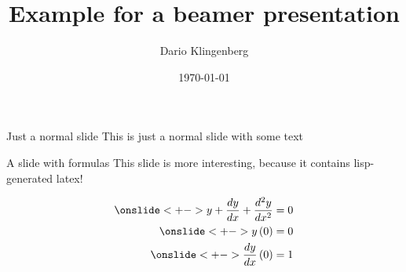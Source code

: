 \documentclass[10pt]{beamer}
\author{Dario Klingenberg}
\date{\today}
\title{Example for a beamer presentation}
\begin{document}
\maketitle

\begin{frame}[label={sec:org174b372}]{Just a normal slide}
This is just a normal slide with some text
\end{frame}
\begin{frame}[label={sec:orgdc86888}]{A slide with formulas}
This slide is more interesting, because it contains lisp-generated latex!

\begin{align*}
\onslide<+->{
y + \frac{d y}{d x} + \frac{d^{2} y}{d x^{2}} =0 }\\
\onslide<+->{
y \left(0\right) = 0 }\\
\onslide<+->{
\frac{d y}{d x} \left(0\right) = 1 }
\end{align*}
\end{frame}
\end{document}
